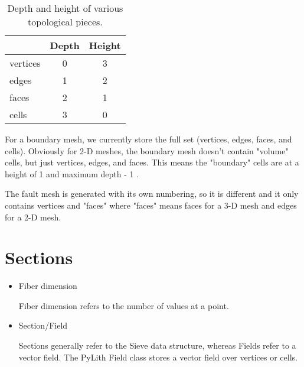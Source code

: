 \documentclass[12pt]{article}
\begin{document}
\begin{table}
\begin{center}
\begin{tabular}{|l|c|c|}
\hline
               & Depth & Height \\
\hline
    vertices   &   0   &   3 \\
    edges      &   1   &   2 \\
    faces      &   2   &   1 \\
    cells      &   3   &   0 \\
\hline
\end{tabular}
\end{center}
\caption{Depth and height of various topological pieces.}
\end{table}

  For a boundary mesh, we currently store the full set (vertices,
  edges, faces, and cells). Obviously for 2-D meshes, the boundary
  mesh doesn't contain "volume" cells, but just vertices, edges, and
  faces. This means the "boundary" cells are at a height of 1 and
  maximum depth - 1 .

  The fault mesh is generated with its own numbering, so it is
  different and it only contains vertices and "faces" where "faces"
  means faces for a 3-D mesh and edges for a 2-D mesh.

\section{Sections}

\begin{itemize}

  \item Fiber dimension

  Fiber dimension refers to the number of values at a point.

  \item Section/Field

  Sections generally refer to the Sieve data structure, whereas Fields
  refer to a vector field. The PyLith Field class stores a vector
  field over vertices or cells.
\end{itemize}
\end{document}
